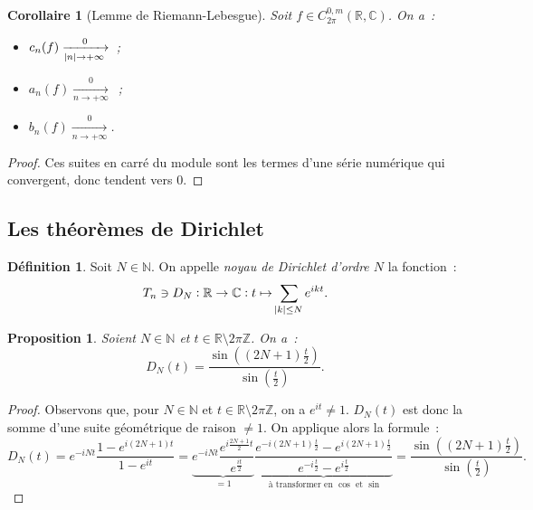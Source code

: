 \documentclass{report}
\newtheorem{prp}[thm]{Proposition}
\newtheorem{cor}[thm]{Corollaire}
\theoremstyle{definition}
\newtheorem{déf}[thm]{Définition}
\theoremstyle{remark}
\numberwithin{equation}{section}
\newcommand{\C}{\mathbb C}
\newcommand{\R}{\mathbb R}
\newcommand{\Z}{\mathbb Z}
\newcommand{\N}{\mathbb N}
\newcommand{\mconv}[3]{\xrightarrow[#1 \to #2]{#3}}
\newcommand{\pinfty}{{+\infty}}
\newcommand{\CmT}[2]{C^{#1,m}_{#2}}
\newcommand{\CzmT}[1]{\CmT 0{#1}}
\newcommand{\Czm}{\CzmT{2\pi}}
\begin{document}
			\begin{cor}[Lemme de Riemann-Lebesgue] Soit $f \in \Czm(\R, \C)$. On a~:
			\begin{itemize}
				\item $c_n(f) \mconv {\abs n}\pinfty 0$~;
				\item $a_n(f) \mconv n\pinfty 0$~;
				\item $b_n(f) \mconv n\pinfty 0$.
			\end{itemize}
			\end{cor}

			\begin{proof} Ces suites en carré du module sont les termes d'une série numérique qui convergent, donc tendent vers $0$.
			\end{proof}

		\subsection{Les théorèmes de Dirichlet}
			\begin{déf} Soit $N \in \N$. On appelle \textit{noyau de Dirichlet d'ordre $N$} la fonction~:
			\begin{equation}
				T_n \ni D_N : \R \to \C : t \mapsto \sum_{\abs k \leq N}e^{ikt}.
			\end{equation}
			\end{déf}

			\begin{prp}\label{prp:noyau de Dirichlet sin} Soient $N \in \N$ et $t \in \R \setminus 2\pi\Z$. On a~:
			\begin{equation}
				D_N(t) = \frac {\sin\left((2N+1)\frac t2\right)}{\sin\left(\frac t2\right)}.
			\end{equation}
			\end{prp}

			\begin{proof} Observons que, pour $N \in \N$ et $t \in \R \setminus 2\pi\Z$, on a $e^{it} \neq 1$. $D_N(t)$ est donc la somme d'une suite géométrique
			de raison $\neq 1$. On applique alors la formule~:
			\begin{equation}
				D_N(t) = e^{-iNt}\frac {1 - e^{i(2N+1)t}}{1 - e^{it}} =
					\underbrace {e^{-iNt}\frac {e^{i\frac {2N+1}2t}}{e^{\frac {it}2}}}_{=1}
					\underbrace {\frac {e^{-i(2N+1)\frac t2} - e^{i(2N+1)\frac t2}}{e^{-i\frac t2} - e^{i\frac t2}}}_{\text{ à transformer en $\cos$ et $\sin$}} = \frac {\sin\left((2N+1)\frac t2\right)}{\sin\left(\frac t2\right)}.
			\end{equation}
			\end{proof}
\end{document}
